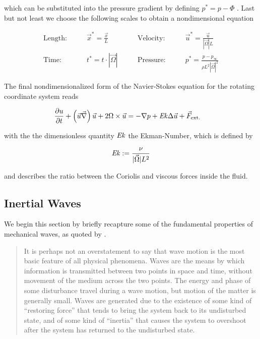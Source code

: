 which can be substituted into the pressure gradient by defining $p^* = p - \Phi$ \citep{tritton88}.
\newpage
Last but not least we choose the following scales to obtain a nondimensional equation

\begin{align}
    \text{Length:}\qquad &  \vec{x}^* = \frac{\vec{x}}{L}  &
    \qquad \text{Velocity:}\qquad& \vec{u}^* =  \frac{\vec{u}}{|\vec{\Omega}|L}\\
    \text{Time:}  \qquad & t^* = t \cdot |\vec{\Omega}| &
    \qquad  \text{Pressure:}\qquad & p^* = \frac{p - p_\infty}{\rho L^2{|\vec{\Omega}|}^2}
\end{align}

The final nondimensionalized form of the Navier-Stokes equation for the rotating coordinate system reads

\begin{align}
    \label{theorie:rotns}
    \pdn[u]{t}+ \left(\vec{u}  \vec{\nabla}\right) \vec{u} + 2\Omega \times \vec{u}  &= -  \nabla p + \Ekman \Delta \vec{u} + \vec{F}_{\text{ext.}}
\end{align}

with the the dimensionless quantity $\mbox{\textit{Ek}}$ the Ekman-Number, which is defined by

\begin{align}
    \mbox{\textit{Ek}} := \frac{\nu}{|\vec{\Omega}| L^2}
\end{align}

and describes the ratio between the Coriolis and viscous forces inside the fluid.

\subsection{Inertial Waves}

We begin this section by briefly recapture some of the fundamental properties of mechanical waves, as quoted by \cite[p.194]{Kundu2012}.

\begin{quote}
It is perhaps not an overstatement to say that wave motion is the most basic feature
of all physical phenomena. Waves are the means by which information is transmitted
between two points in space and time, without movement of the medium across the
two points. The energy and phase of some disturbance travel during a wave motion,
but motion of the matter is generally small. Waves are generated due to the existence of
some kind of “restoring force” that tends to bring the system back to its undisturbed
state, and of some kind of “inertia” that causes the system to overshoot after the
system has returned to the undisturbed state.
\end{quote}

